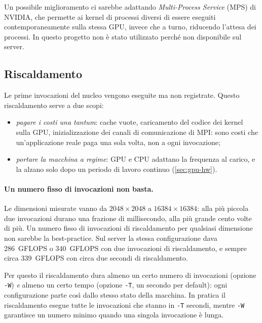 \documentclass[11pt,a4paper]{article}
\begin{document}
Un possibile miglioramento ci sarebbe adattando \emph{Multi-Process Service} (MPS) di NVIDIA,
che permette ai kernel di processi diversi di essere eseguiti
contemporaneamente sulla stessa GPU, invece che a turno, riducendo l'attesa dei processi. In questo progetto non è stato utilizzato perché non disponibile
sul server.

\subsection{Riscaldamento}\label{sec:riscaldamento}

Le prime invocazioni del nucleo vengono eseguite ma non registrate. Questo
riscaldamento serve a due scopi:
\begin{itemize}
  \item \emph{pagare i costi una tantum}: cache vuote, caricamento del codice
        dei kernel sulla GPU, inizializzazione dei canali di comunicazione di MPI: sono costi che un'applicazione reale paga una sola volta, non a
        ogni invocazione;
  \item \emph{portare la macchina a regime}: GPU e CPU adattano la frequenza al
        carico, e la alzano solo dopo un periodo di lavoro continuo
        (\cref{sec:gpu-hw}).
\end{itemize}

\paragraph{Un numero fisso di invocazioni non basta.} Le dimensioni misurate
vanno da $2048 \times 2048$ a $16384 \times 16384$: alla più piccola due
invocazioni durano una frazione di millisecondo, alla più grande cento volte di
più. Un numero fisso di invocazioni di riscaldamento per qualsiasi dimensione non sarebbe la best-practice.
Sul server la stessa
configurazione dava \SI{286}{GFLOPS} o \SI{340}{GFLOPS} con due invocazioni di
riscaldamento, e sempre circa \SI{339}{GFLOPS} con circa due secondi di
riscaldamento.

Per questo il riscaldamento dura almeno un certo numero di invocazioni
(opzione \texttt{-W}) \emph{e} almeno un certo tempo (opzione \texttt{-T}, un
secondo per default): ogni configurazione parte così dallo stesso stato della
macchina. In pratica il riscaldamento esegue tutte le invocazioni che stanno in
\texttt{-T} secondi, mentre \texttt{-W} garantisce un numero minimo quando una
singola invocazione è lunga.
\end{document}
